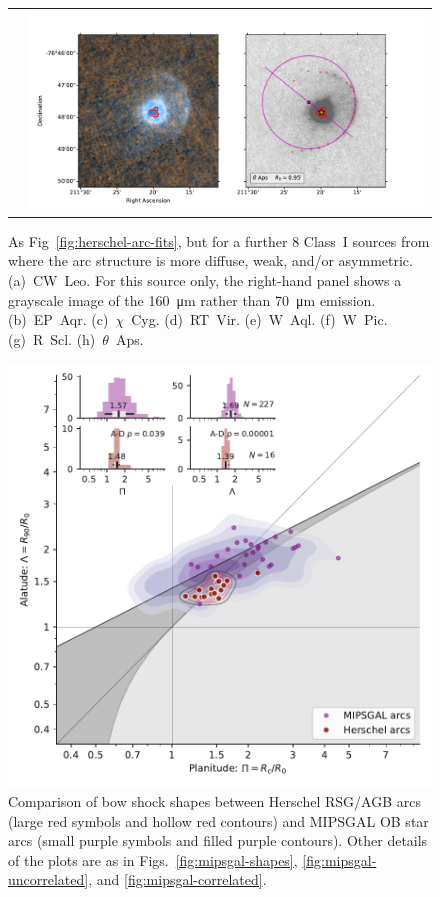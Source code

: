 \documentclass[useAMS, usenatbib, a4paper]{mnras}
\begin{document}
\begin{figure}
\begin{tabular}{ll}
    & \includegraphics[trim=10 0 65 20, clip]{figs/tetaps-imageplot}
  \end{tabular}
  \caption{As Fig~\ref{fig:herschel-arc-fits}, but for a further 8
    Class~I sources from \citet{Cox:2012a} where the arc structure is
    more diffuse, weak, and/or asymmetric. (a)~CW~Leo. For this source
    only, the right-hand panel shows a grayscale image of the
    \SI{160}{\um} rather than \SI{70}{\um}
    emission. (b)~EP~Aqr. (c)~\(\chi\)~Cyg. (d)~RT~Vir. (e)~W~Aql. (f)~W~Pic. (g)~R~Scl.
    (h)~\(\theta\)~Aps.}
  \label{fig:herschel-arc-fits-poor}
\end{figure}


\begin{figure}
  \centering
  \includegraphics[width=\linewidth]{figs/mipsgal-Rc-R90-vs-Herschel}
  \vspace*{-\baselineskip}
  \caption[]{Comparison of bow shock shapes between Herschel RSG/AGB
    arcs (large red symbols and hollow red contours) and MIPSGAL OB
    star arcs (small purple symbols and filled purple contours).
    Other details of the plots are as in
    Figs.~\ref{fig:mipsgal-shapes}, \ref{fig:mipsgal-uncorrelated},
    and \ref{fig:mipsgal-correlated}.}
  \label{fig:herschel-compare-mipsgal}
\end{figure}
\end{document}
